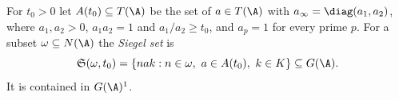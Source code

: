 For $t_0>0$ let $A(t_0)\subseteq T(\A)$ be the set of $a\in T(\A)$ with $a_\infty=\diag(a_1,a_2)$, where
$a_1,a_2>0$, $a_1a_2=1$ and $a_1/a_2\ge t_0$, and $a_p=1$ for every prime $p$. For a subset $\omega\subseteq N(\A)$ the
\emph{Siegel set} is
\[
  \mathfrak S(\omega,t_0)=\{nak:n\in\omega,\ a\in A(t_0),\ k\in K\}\subseteq G(\A).
\]
It is contained in $G(\A)^1$.
